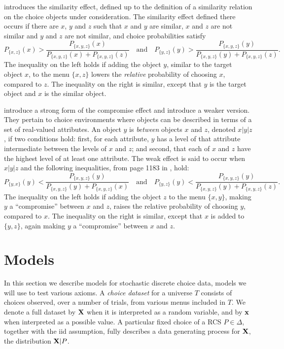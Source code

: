 \documentclass[11pt,letter]{article}
\newcommand{\menu}{menu}
\newcommand{\menus}{menus}
\newcommand{\bin}[2]{P_{\{#1,#2\}}(#1)}
\begin{document}
 introduces the similarity effect, defined up to the definition of a similarity relation on the choice objects under consideration.
The similarity effect defined there occurs if there are $x$, $y$ and $z$ such that $x$ and $y$ are similar, $x$ and $z$ are not similar and $y$ and $z$ are not similar, and choice probabilities satisfy
\[
	\bin{x}{z} > \frac{P_{\{x,y,z\}}(x)}{P_{\{x,y,z\}}(x) + P_{\{x,y,z\}}(z)}
	\quad \mbox{and} \quad
	\bin{y}{z} > \frac{P_{\{x,y,z\}}(y)}{P_{\{x,y,z\}}(y) + P_{\{x,y,z\}}(z)}.
\]
The inequality on the left holds if adding the object $y$, similar to the target object $x$, to the \menu{} $\{x,z\}$ lowers the {\em relative} probability of choosing $x$, compared to $z$.
The inequality on the right is similar, except that $y$ is the target object and $x$ is the similar object.

 introduce a strong form of the compromise effect and  introduce a weaker version.
They pertain to choice environments where objects can be described in terms of a set of real-valued attributes.
An object $y$ is {\em between} objects $x$ and $z$, denoted $x|y|z$, if two conditions hold: first, for each attribute, $y$ has a level of that attribute intermediate between the levels of $x$ and $z$; and second, that each of $x$ and $z$ have the highest level of at least one attribute.
The weak effect is said to occur when $x|y|z$ and the following inequalities, from page 1183 in , hold:
\[
	\bin{y}{x} < \frac{P_{\{x,y,z\}}(y)}{P_{\{x,y,z\}}(y) + P_{\{x,y,z\}}(x)}
	\quad \mbox{and} \quad
	\bin{y}{z} < \frac{P_{\{x,y,z\}}(y)}{P_{\{x,y,z\}}(y) + P_{\{x,y,z\}}(z)}.
\]
The inequality on the left holds if adding the object $z$ to the \menu{} $\{x,y\}$, making $y$ a ``compromise'' between $x$ and $z$, raises the relative probability of choosing $y$, compared to $x$.
The inequality on the right is similar, except that $x$ is added to $\{y,z\}$, again making $y$ a ``compromise'' between $x$ and $z$.

\section{Models}\label{s:models}

In this section we describe models for stochastic discrete choice data, models we will use to test various axioms.
A {\em choice dataset} for a universe $T$ consists of choices observed, over a number of trials, from various \menus{} included in $T$.
We denote a full dataset by $\bf{X}$ when it is interpreted as a random variable, and by $\bf{x}$ when interpreted as a possible value.
A particular fixed choice of a RCS $P \in \Delta$, together with the iid assumption, fully describes a data generating process for $\bf{X}$, the distribution ${\bf X}|P$.
\end{document}
